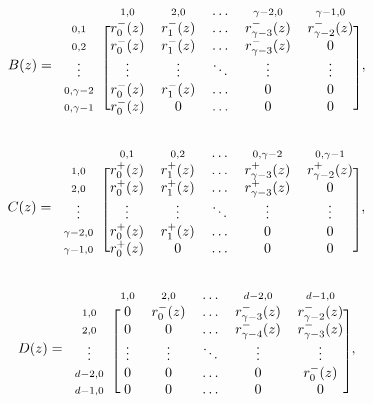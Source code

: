 \documentclass{article}
\begin{document}
\begin{equation*}
B(z) = 
\begin{blockarray}{cccccc}
   & \scriptstyle{1,0} & \scriptstyle{2,0} & \ldots &
    \scriptstyle{\gamma-2,0} & \scriptstyle{\gamma-1,0} \\
\begin{block}{c[ccccc]}
\scriptstyle{0,1} & r_0^-(z) & r_1^-(z) & \ldots &
    r_{\gamma-3}^-(z) & r_{\gamma-2}^-(z) \\
\scriptstyle{0,2} & r_0^-(z) & r_1^-(z) & \ldots &
    r_{\gamma-3}^-(z) & 0 \\
\vdots & \vdots & \vdots & \ddots & \vdots & \vdots \\
\scriptstyle{0,\gamma-2} & r_0^-(z) & r_1^-(z) & \ldots & 0 & 0 \\
\scriptstyle{0,\gamma-1} & r_0^-(z) & 0 & \ldots & 0 & 0 \\
\end{block}
\end{blockarray},
\end{equation*}

\begin{equation*}
C(z) = 
\begin{blockarray}{cccccc}
   & \scriptstyle{0,1} & \scriptstyle{0,2} & \ldots &
    \scriptstyle{0,\gamma-2} & \scriptstyle{0,\gamma-1} \\
\begin{block}{c[ccccc]}
\scriptstyle{1,0} & r_0^+(z) & r_1^+(z) & \ldots &
    r_{\gamma-3}^+(z) & r_{\gamma-2}^+(z) \\
\scriptstyle{2,0} & r_0^+(z) & r_1^+(z) & \ldots &
    r_{\gamma-3}^+(z) & 0 \\
\vdots & \vdots & \vdots & \ddots & \vdots & \vdots \\
\scriptstyle{\gamma-2,0} & r_0^+(z) & r_1^+(z) & \ldots & 0 & 0 \\
\scriptstyle{\gamma-1,0} & r_0^+(z) & 0 & \ldots & 0 & 0 \\
\end{block}
\end{blockarray},
\end{equation*}

\begin{equation*}
D(z) = 
\begin{blockarray}{cccccc}
   & \scriptstyle{1,0} & \scriptstyle{2,0} & \ldots &
    \scriptstyle{d-2,0} & \scriptstyle{d-1,0} \\
\begin{block}{c[ccccc]}
\scriptstyle{1,0} & 0 & r_0^-(z) & \ldots &
    r_{\gamma-3}^-(z) & r_{\gamma-2}^-(z) \\
\scriptstyle{2,0} & 0 & 0 & \ldots &
    r_{\gamma-4}^-(z) & r_{\gamma-3}^-(z) \\
\vdots & \vdots & \vdots & \ddots & \vdots & \vdots \\
\scriptstyle{d-2,0} & 0 & 0 & \ldots & 0 & r_0^-(z) \\
\scriptstyle{d-1,0} & 0 & 0 & \ldots & 0 & 0 \\
\end{block}
\end{blockarray},
\end{equation*}
\end{document}
